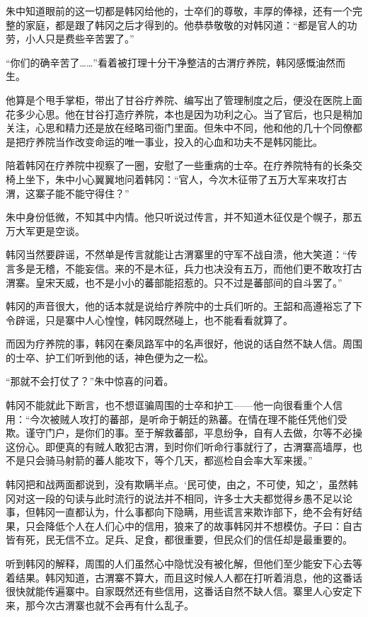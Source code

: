 朱中知道眼前的这一切都是韩冈给他的，士卒们的尊敬，丰厚的俸禄，还有一个完整的家庭，都是跟了韩冈之后才得到的。他恭恭敬敬的对韩冈道：“都是官人的功劳，小人只是费些辛苦罢了。”

“你们的确辛苦了……”看着被打理十分干净整洁的古渭疗养院，韩冈感慨油然而生。

他算是个甩手掌柜，带出了甘谷疗养院、编写出了管理制度之后，便没在医院上面花多少心思。他在甘谷打造疗养院，本也是因为功利之心。当了官后，也只是稍加关注，心思和精力还是放在经略司衙门里面。但朱中不同，他和他的几十个同僚都是把疗养院当作改变命运的唯一事业，投入的心血和功夫不是韩冈能比。

陪着韩冈在疗养院中视察了一圈，安慰了一些重病的士卒。在疗养院特有的长条交椅上坐下，朱中小心翼翼地问着韩冈：“官人，今次木征带了五万大军来攻打古渭，这寨子能不能守得住？”

朱中身份低微，不知其中内情。他只听说过传言，并不知道木征仅是个幌子，那五万大军更是空谈。

韩冈当然要辟谣，不然单是传言就能让古渭寨里的守军不战自溃，他大笑道：“传言多是无稽，不能妄信。来的不是木征，兵力也决没有五万，而他们更不敢攻打古渭寨。皇宋天威，也不是小小的蕃部能招惹的。只不过是蕃部间的自斗罢了。”

韩冈的声音很大，他的话本就是说给疗养院中的士兵们听的。王韶和高遵裕忘了下令辟谣，只是寨中人心惶惶，韩冈既然碰上，也不能看看就算了。

而因为疗养院的事，韩冈在秦凤路军中的名声很好，他说的话自然不缺人信。周围的士卒、护工们听到他的话，神色便为之一松。

“那就不会打仗了？”朱中惊喜的问着。

韩冈不能就此下断言，也不想诓骗周围的士卒和护工——他一向很看重个人信用：“今次被贼人攻打的蕃部，是听命于朝廷的熟蕃。在情在理不能任凭他们受欺。谨守门户，是你们的事。至于解救蕃部，平息纷争，自有人去做，尔等不必操这份心。即便真的有贼人敢犯古渭，到时你们听命行事就行了，古渭寨高墙厚，也不是只会骑马射箭的蕃人能攻下，等个几天，都巡检自会率大军来援。”

韩冈把和战两面都说到，没有欺瞒半点。‘民可使，由之，不可使，知之’，虽然韩冈对这一段的句读与此时流行的说法并不相同，许多士大夫都觉得乡愚不足以论事，但韩冈一直都认为，什么事都向下隐瞒，用些谎言来欺诈部下，绝不会有好结果，只会降低个人在人们心中的信用，狼来了的故事韩冈并不想模仿。子曰：自古皆有死，民无信不立。足兵、足食，都很重要，但民众们的信任却是最重要的。

听到韩冈的解释，周围的人们虽然心中隐忧没有被化解，但他们至少能安下心去等着结果。韩冈知道，古渭寨不算大，而且这时候人人都在打听着消息，他的这番话很快就能传遍寨中。自家既然还有些信用，这番话自然不缺人信。寨里人心安定下来，那今次古渭寨也就不会再有什么乱子。

